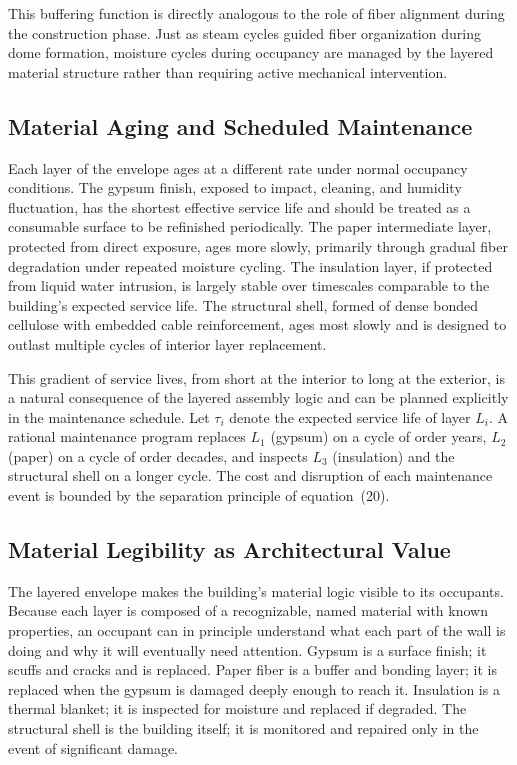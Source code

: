 \documentclass[12pt,a4paper]{article}
\begin{document}
This buffering function is directly analogous to the role of fiber
alignment during the construction phase. Just as steam cycles guided
fiber organization during dome formation, moisture cycles during
occupancy are managed by the layered material structure rather than
requiring active mechanical intervention.

\subsection{Material Aging and Scheduled Maintenance}

Each layer of the envelope ages at a different rate under normal
occupancy conditions. The gypsum finish, exposed to impact, cleaning,
and humidity fluctuation, has the shortest effective service life and
should be treated as a consumable surface to be refinished periodically.
The paper intermediate layer, protected from direct exposure, ages
more slowly, primarily through gradual fiber degradation under repeated
moisture cycling. The insulation layer, if protected from liquid water
intrusion, is largely stable over timescales comparable to the
building's expected service life. The structural shell, formed of dense
bonded cellulose with embedded cable reinforcement, ages most slowly
and is designed to outlast multiple cycles of interior layer replacement.

This gradient of service lives, from short at the interior to long at
the exterior, is a natural consequence of the layered assembly logic
and can be planned explicitly in the maintenance schedule. Let $\tau_i$
denote the expected service life of layer $L_i$. A rational maintenance
program replaces $L_1$ (gypsum) on a cycle of order years, $L_2$
(paper) on a cycle of order decades, and inspects $L_3$ (insulation)
and the structural shell on a longer cycle. The cost and disruption
of each maintenance event is bounded by the separation principle of
equation~(20).

\subsection{Material Legibility as Architectural Value}

The layered envelope makes the building's material logic visible to its
occupants. Because each layer is composed of a recognizable, named
material with known properties, an occupant can in principle understand
what each part of the wall is doing and why it will eventually need
attention. Gypsum is a surface finish; it scuffs and cracks and is
replaced. Paper fiber is a buffer and bonding layer; it is replaced
when the gypsum is damaged deeply enough to reach it. Insulation is
a thermal blanket; it is inspected for moisture and replaced if
degraded. The structural shell is the building itself; it is monitored
and repaired only in the event of significant damage.
\end{document}
